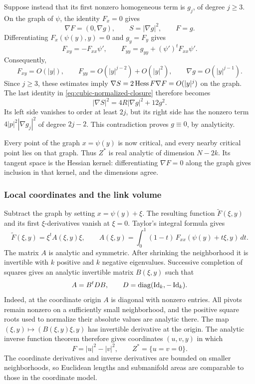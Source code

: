 Suppose instead that its first nonzero homogeneous term is \(g_j\),
of degree \(j\geq3\).  On the graph of \(\psi\), the identity
\(F_x=0\) gives
\[
 \nabla F=(0,\nabla g),\qquad S=|\nabla g|^2,\qquad F=g.
\]
Differentiating \(F_x(\psi(y),y)=0\) and \(g_y=F_y\) gives
\[
 F_{xy}=-F_{xx}\psi',\qquad
 F_{yy}=g_{yy}+(\psi')^tF_{xx}\psi'.
\]
Consequently,
\[
 F_{xy}=O(|y|),\qquad
 F_{yy}=O(|y|^{j-2})+O(|y|^2),\qquad
 \nabla g=O(|y|^{j-1}).
\]
Since \(j\geq3\), these estimates imply
\(\nabla S=2\operatorname{Hess} F\nabla F=O(|y|^j)\) on the graph.
The last identity in \eqref{eq:cubic-normalized-closure} therefore
becomes
\[
 |\nabla S|^2=4R|\nabla g|^2+12g^2.
\]
Its left side vanishes to order at least \(2j\), but its right
side has the nonzero term
\(4|p|^2|\nabla g_j|^2\) of degree \(2j-2\).
This contradiction proves \(g\equiv0\), by analyticity.

Every point of the graph \(x=\psi(y)\) is now critical, and every
nearby critical point lies on that graph.  Thus \(Z^*\) is
real analytic of dimension \(N-2k\).  Its tangent space is the
Hessian kernel: differentiating \(\nabla F=0\) along the graph
gives inclusion in that kernel, and the dimensions agree.

\subsubsection{Local coordinates and the link volume}
Subtract the graph by setting \(x=\psi(y)+\xi\).  The resulting
function \(\widetilde F(\xi,y)\) and its first \(\xi\)-derivatives
vanish at \(\xi=0\).  Taylor's integral formula gives
\[
 \widetilde F(\xi,y)=\xi^t A(\xi,y)\xi,\qquad
 A(\xi,y)=\int_0^1(1-t)\,
 F_{xx}(\psi(y)+t\xi,y)\,dt.
\]
The matrix \(A\) is analytic and symmetric.  After shrinking the
neighborhood it is invertible with \(k\) positive and \(k\)
negative eigenvalues.  Successive completion of squares gives
an analytic invertible matrix \(B(\xi,y)\) such that
\[
 A=B^tDB,\qquad D=\operatorname{diag}(\operatorname{Id}_k,-\operatorname{Id}_k).
\]
Indeed, at the coordinate origin \(A\) is diagonal with nonzero
entries.  All pivots remain nonzero on a sufficiently small
neighborhood, and the positive square roots used to normalize their
absolute values are analytic there.  The map
\((\xi,y)\mapsto(B(\xi,y)\xi,y)\) has invertible derivative at
the origin.  The analytic inverse function theorem therefore gives
coordinates \((u,v,y)\) in which
\[
 F=|u|^2-|v|^2,\qquad Z^*=\{u=v=0\}.
\]
The coordinate derivatives and inverse derivatives are bounded on smaller
neighborhoods, so Euclidean lengths and submanifold areas are
comparable to those in the coordinate model.

